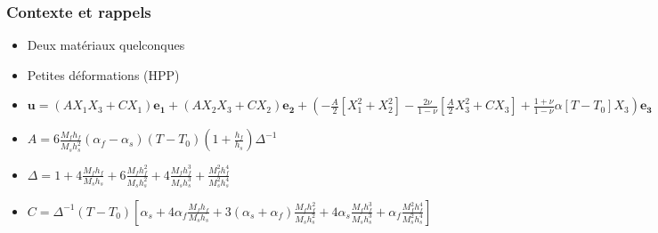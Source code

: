 \documentclass{beamer}
\begin{document}
\begin{frame}
    \frametitle{Contexte et rappels}
    \begin{itemize}
        \item Deux matériaux quelconques
        \item Petites déformations (HPP)
        \item $\bm{u} = (AX_1X_3 + CX_1)\bm{e_1} + (AX_2X_3 + CX_2)\bm{e_2} + (-\frac{A}{2}\left[X_1^2+X_2^2\right]-\frac{2\nu}{1-\nu}\left[\frac{A}{2}X_3^2+CX_3\right]+\frac{1+\nu}{1-\nu}\alpha\left[T-T_0\right]X_3)\bm{e_3}$
        \item $A = 6\frac{M_fh_f}{M_sh_s^2}(\alpha_f-\alpha_s)(T-T_0)(1+\frac{h_f}{h_s})\Delta^{-1}$
        \item $\Delta = 1+4\frac{M_fh_f}{M_sh_s}+6\frac{M_fh_f^2}{M_sh_s^2}+4\frac{M_fh_f^3}{M_sh_s^3}+\frac{M_f^2h_f^4}{M_s^2h_s^4}$
        \item $C = \Delta^{-1}(T-T_0)\left[\alpha_s + 4 \alpha_f \frac{M_fh_f}{M_sh_s} + 3 (\alpha_s + \alpha_f)\frac{M_fh_f^2}{M_sh_s^2} + 4\alpha_s \frac{M_fh_f^3}{M_sh_s^3} + \alpha_f \frac{M_f^2h_f^4}{M_s^2h_s^4}  \right]$
    \end{itemize}
\end{frame}

    
\end{document}
